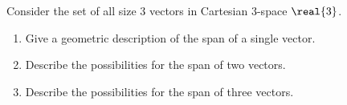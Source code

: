 Consider the set of all size $3$ vectors in Cartesian 3-space $\real{3}$.
\begin{enumerate}
\item Give a geometric description of the span of a single vector.
\item Describe the possibilities for the span of two vectors.
\item Describe the possibilities for the span of three vectors.
\end{enumerate}
